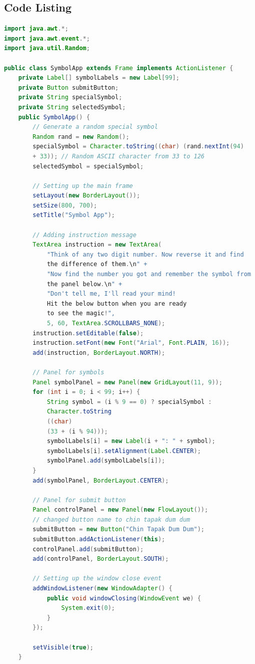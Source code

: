 \documentclass[12pt, a4paper]{article}
\begin{document}
\subsection{Code Listing}
\begin{lstlisting}[language=Java, caption=Java Swing Application Code]
import java.awt.*;
import java.awt.event.*;
import java.util.Random;

public class SymbolApp extends Frame implements ActionListener {
    private Label[] symbolLabels = new Label[99];
    private Button submitButton;
    private String specialSymbol;
    private String selectedSymbol;
    public SymbolApp() {
        // Generate a random special symbol
        Random rand = new Random();
        specialSymbol = Character.toString((char) (rand.nextInt(94)
        + 33)); // Random ASCII character from 33 to 126
        selectedSymbol = specialSymbol;

        // Setting up the main frame
        setLayout(new BorderLayout());
        setSize(800, 700);
        setTitle("Symbol App");

        // Adding instruction message
        TextArea instruction = new TextArea(
            "Think of any two digit number. Now reverse it and find
            the difference of them.\n" +
            "Now find the number you got and remember the symbol from
            the panel below.\n" +
            "Don't tell me, I'll read your mind!
            Hit the below button when you are ready
            to see the magic!",
            5, 60, TextArea.SCROLLBARS_NONE);
        instruction.setEditable(false);
        instruction.setFont(new Font("Arial", Font.PLAIN, 16));
        add(instruction, BorderLayout.NORTH);

        // Panel for symbols
        Panel symbolPanel = new Panel(new GridLayout(11, 9));
        for (int i = 0; i < 99; i++) {
            String symbol = (i % 9 == 0) ? specialSymbol : 
            Character.toString
            ((char) 
            (33 + (i % 94)));
            symbolLabels[i] = new Label(i + ": " + symbol);
            symbolLabels[i].setAlignment(Label.CENTER);
            symbolPanel.add(symbolLabels[i]);
        }
        add(symbolPanel, BorderLayout.CENTER);

        // Panel for submit button
        Panel controlPanel = new Panel(new FlowLayout());
        // changed button name to chin tapak dum dum
        submitButton = new Button("Chin Tapak Dum Dum"); 
        submitButton.addActionListener(this);
        controlPanel.add(submitButton);
        add(controlPanel, BorderLayout.SOUTH);

        // Setting up the window close event
        addWindowListener(new WindowAdapter() {
            public void windowClosing(WindowEvent we) {
                System.exit(0);
            }
        });

        setVisible(true);
    }
\end{lstlisting}
\end{document}
